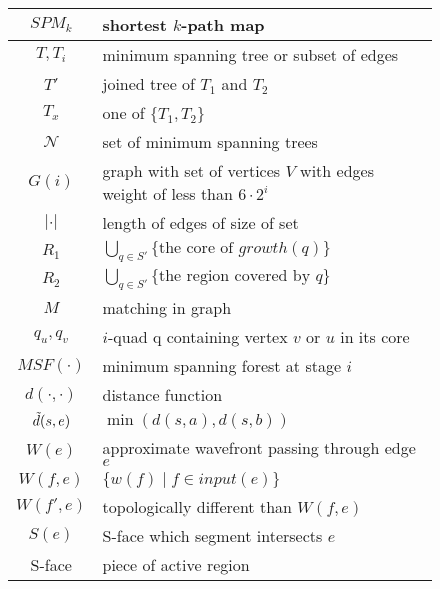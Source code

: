 \begin{figure}
\begin{center}
\begin{tabular}{| c | l |}
	\hline
	$SPM_k$ & shortest $k$-path map\\
	\hline
	$T, T_i$ & minimum spanning tree or subset of edges \\
	\hline
	$T'$ & joined tree of $T_1$ and $T_2$ \\
	\hline
	$T_x$ & one of $\{T_1, T_2\}$ \\
	\hline
	$\mathcal{N}$ & set of minimum spanning trees \\
	\hline
	$G(i)$ & graph with set of vertices $V$ with edges weight of less than $6 \cdot 2^i$ \\
	\hline
	$|\cdot|$ & length of edges of size of set \\
	\hline
	$R_1$ & $\bigcup_{q \in S'} \{\text{the core of } growth(q)\}$ \\
	\hline
	$R_2$ & $\bigcup_{q \in S'} \{\text{the region covered by } q\}$ \\
	\hline
	$M$ & matching in graph \\
	\hline
	$q_u, q_v$ & $i$-quad q containing vertex $v$ or $u$ in its core \\
	\hline
	$MSF(\cdot)$ & minimum spanning forest at stage $i$ \\
	\hline
	$d(\cdot, \cdot)$ & distance function \\
	\hline
	$\Tilde{d}(s,e)$ & $\min(d(s,a),d(s,b))$ \\
	\hline
	$W(e)$ & approximate wavefront passing through edge $e$ \\
	\hline
	$W(f,e)$ & $\{w(f) \mid f \in input(e)\}$ \\
	\hline
	$W(f',e)$ & topologically different than $W(f,e)$ \\
	\hline
	$S(e)$ & S-face which segment intersects $e$ \\
	\hline
	S-face & piece of active region \\
	\hline
\end{tabular}
\end{center}
\end{figure}
